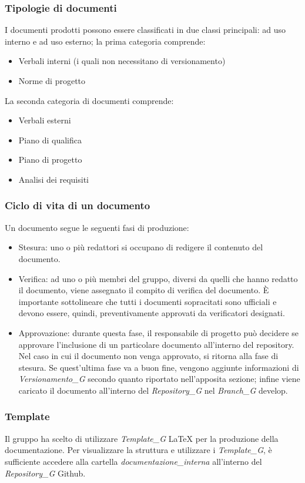 \documentclass[12pt, oneside]{article}
\begin{document}
\subsubsection{Tipologie di documenti}
I documenti prodotti possono essere classificati in due classi principali: ad uso interno e ad uso esterno; la prima categoria comprende:
\begin{itemize}
    \item Verbali interni (i quali non necessitano di versionamento)
    \item Norme di progetto
\end{itemize}
La seconda categoria di documenti comprende:
\begin{itemize}
    \item Verbali esterni
    \item Piano di qualifica
    \item Piano di progetto
    \item Analisi dei requisiti
\end{itemize}
\subsubsection{Ciclo di vita di un documento}
Un documento segue le seguenti fasi di produzione:
\begin{itemize}
    \item Stesura: uno o più redattori si occupano di redigere il contenuto del documento.
    \item Verifica: ad uno o più membri del gruppo, diversi da quelli che hanno redatto il documento, viene assegnato il compito di verifica del documento.
È importante sottolineare che tutti i documenti sopracitati sono ufficiali e devono essere, quindi, preventivamente approvati da verificatori designati.
    \item Approvazione: durante questa fase, il responsabile di progetto può decidere se approvare l'inclusione di un particolare documento all'interno del repository. Nel caso in cui il documento non venga approvato, si ritorna alla fase di stesura.
    Se quest'ultima fase va a buon fine, vengono aggiunte informazioni di \textit{Versionamento_G} secondo quanto riportato nell'apposita sezione; infine viene caricato il documento all'interno del \textit{Repository_G} nel \textit{Branch_G} develop.
\end{itemize}
\subsubsection{Template}
Il gruppo ha scelto di utilizzare \textit{Template_G} LaTeX per la produzione della documentazione. Per visualizzare la struttura e utilizzare i \textit{Template_G}, è sufficiente accedere alla cartella \textit{documentazione\_interna} all'interno del \textit{Repository_G} Github.
\end{document}
